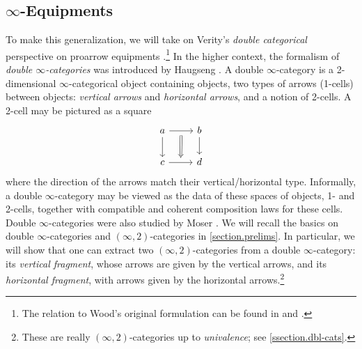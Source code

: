 \documentclass[a4paper, 11pt]{amsart}
\numberwithin{theorem}{section}
\theoremstyle{definition}
\begin{document}
\subsection{$\infty$-Equipments} 
To make this generalization, we will take on Verity's \textit{double categorical} perspective 
on proarrow equipments \cite{Verity}.\footnote{The relation to Wood's original formulation can be found in \cite[Definition 1.2.4]{Verity} and \cite[Appendix C]{ShulmanFramedBicats}.}
In the higher context, the formalism of \textit{double $\infty$-categories} was introduced by Haugseng \cite{HaugsengPhD}.
A double $\infty$-category is a 2-dimensional $\infty$-categorical object containing objects, 
 two types of arrows (1-cells) between objects: \textit{vertical arrows} and \textit{horizontal arrows}, 
and a notion of 2-cells. A 2-cell may be pictured as a square
\[
	\begin{tikzcd}
		a \arrow[r, ""'name=f]\arrow[d] & b \arrow[d] \\
		c \arrow[r, ""name=t] & d
		\arrow[from=f, to=t, Rightarrow]
	\end{tikzcd}
\]
where the direction of the arrows match their vertical/horizontal type. Informally, a double $\infty$-category 
may be viewed as the data of these spaces of objects, 1- and 2-cells, together with compatible and coherent composition laws for these cells. Double $\infty$-categories were also studied by Moser \cite{Moser}. 
We will recall the basics on double $\infty$-categories and $(\infty,2)$-categories in \cref{section.prelims}. In particular, we will show that one can extract 
two $(\infty,2)$-categories from a double $\infty$-category: its \textit{vertical fragment}, whose arrows are given by the vertical arrows, and its \textit{horizontal fragment}, with arrows 
given by the horizontal arrows.\footnote{These are really $(\infty,2)$-categories up to \textit{univalence}; see \cref{ssection.dbl-cats}.}
\end{document}
